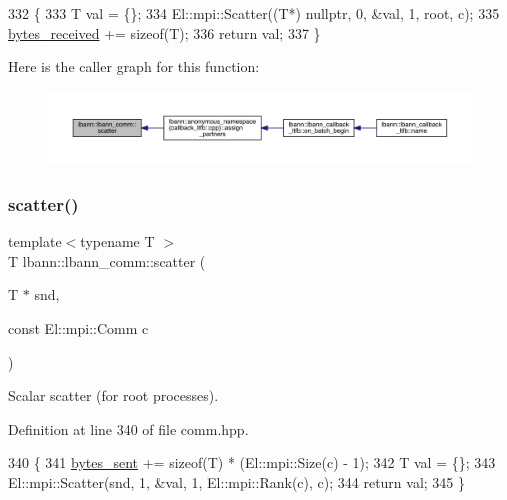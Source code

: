 \begin{DoxyCode}
332                                          \{
333     T val = \{\};
334     El::mpi::Scatter((T*) \textcolor{keyword}{nullptr}, 0, &val, 1, root, c);
335     \hyperlink{classlbann_1_1lbann__comm_afb99f57f7eafc0695bf28e6c26a8120f}{bytes\_received} += \textcolor{keyword}{sizeof}(T);
336     \textcolor{keywordflow}{return} val;
337   \}
\end{DoxyCode}
Here is the caller graph for this function\+:\nopagebreak
\begin{figure}[H]
\begin{center}
\leavevmode
\includegraphics[width=350pt]{classlbann_1_1lbann__comm_a74b5c594bfa5aec03af9ad2bd8f5e979_icgraph}
\end{center}
\end{figure}
\mbox{\label{classlbann_1_1lbann__comm_a4918100a99e03a6bca3ec304cb282172}} 
\subsubsection{\texorpdfstring{scatter()}{scatter()}\hspace{0.1cm}{\footnotesize\ttfamily [2/2]}}
{\footnotesize\ttfamily template$<$typename T $>$ \\
T lbann\+::lbann\+\_\+comm\+::scatter (\begin{DoxyParamCaption}\item[{T $\ast$}]{snd,  }\item[{const El\+::mpi\+::\+Comm}]{c }\end{DoxyParamCaption})\hspace{0.3cm}{\ttfamily [inline]}}

Scalar scatter (for root processes). 

Definition at line 340 of file comm.\+hpp.


\begin{DoxyCode}
340                                        \{
341     \hyperlink{classlbann_1_1lbann__comm_ad1f146ae7337ece6266fd307944928e0}{bytes\_sent} += \textcolor{keyword}{sizeof}(T) * (El::mpi::Size(c) - 1);
342     T val = \{\};
343     El::mpi::Scatter(snd, 1, &val, 1, El::mpi::Rank(c), c);
344     \textcolor{keywordflow}{return} val;
345   \}
\end{DoxyCode}
\mbox{\label{classlbann_1_1lbann__comm_a086078b881e7250df140ac116adb1939}} 
